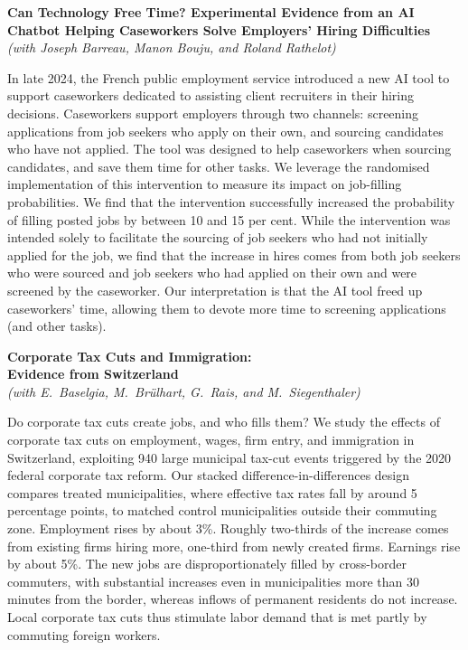 \documentclass[11pt]{article}
\begin{document}
\vspace{8mm}
\hypertarget{abs:matchft}{}%
\begin{center}
{\Large\bfseries Can Technology Free Time? Experimental Evidence from an AI Chatbot Helping Caseworkers Solve Employers' Hiring Difficulties}\\[1mm]
{\itshape (with Joseph Barreau, Manon Bouju, and Roland Rathelot)}
\end{center}

In late 2024, the French public employment service introduced a new AI tool to support caseworkers dedicated to assisting client recruiters in their hiring decisions. Caseworkers support employers through two channels: screening applications from job seekers who apply on their own, and sourcing candidates who have not applied. The tool was designed to help caseworkers when sourcing candidates, and save them time for other tasks. We leverage the randomised implementation of this intervention to measure its impact on job-filling probabilities. We find that the intervention successfully increased the probability of filling posted jobs by between 10 and 15 per cent. While the intervention was intended solely to facilitate the sourcing of job seekers who had not initially applied for the job, we find that the increase in hires comes from both job seekers who were sourced and job seekers who had applied on their own and were screened by the caseworker. Our interpretation is that the AI tool freed up caseworkers' time, allowing them to devote more time to screening applications (and other tasks).

\vspace{8mm}
\hypertarget{abs:ctax}{}%
\begin{center}
{\Large\bfseries Corporate Tax Cuts and Immigration:\\ Evidence from Switzerland}\\[1mm]
{\itshape (with E.~Baselgia, M.~Br\"ulhart, G.~Rais, and M.~Siegenthaler)}
\end{center}

Do corporate tax cuts create jobs, and who fills them? We study the effects of corporate tax cuts on employment, wages, firm entry, and immigration in Switzerland, exploiting 940 large municipal tax-cut events triggered by the 2020 federal corporate tax reform. Our stacked difference-in-differences design compares treated municipalities, where effective tax rates fall by around 5 percentage points, to matched control municipalities outside their commuting zone. Employment rises by about 3\%. Roughly two-thirds of the increase comes from existing firms hiring more, one-third from newly created firms. Earnings rise by about 5\%. The new jobs are disproportionately filled by cross-border commuters, with substantial increases even in municipalities more than 30 minutes from the border, whereas inflows of permanent residents do not increase. Local corporate tax cuts thus stimulate labor demand that is met partly by commuting foreign workers.
\end{document}

